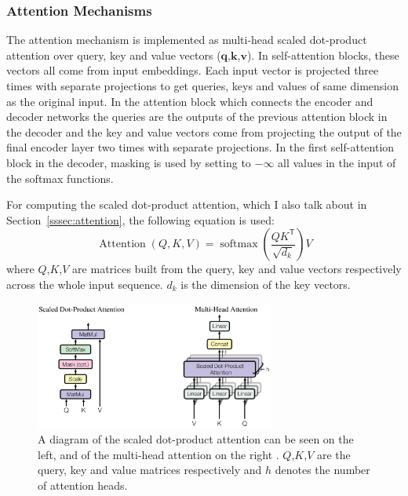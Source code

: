 \documentclass[12pt]{article}
\DeclareMathOperator{\Attention}{Attention}
\DeclareMathOperator{\softmax}{softmax}
\begin{document}
\subsubsection{Attention Mechanisms} \label{sssec:trf_attention}
The attention mechanism is implemented as multi-head scaled dot-product attention over query, key and value vectors (\(\bm{q}\),\(\bm{k}\),\(\bm{v}\)). In self-attention blocks, these vectors all come from input embeddings. Each input vector is projected three times with separate projections to get queries, keys and values of same dimension as the original input. In the attention block which connects the encoder and decoder networks the queries are the outputs of the previous attention block in the decoder and the key and value vectors come from projecting the output of the final encoder layer two times with separate projections. In the first self-attention block in the decoder, masking is used by setting to \(-\infty\) all values in the input of the softmax functions.

For computing the scaled dot-product attention, which I also talk about in Section~\ref{sssec:attention}, the following equation is used:
\begin{equation}
\Attention(Q,K,V)=\softmax\left(\frac{QK^\mathsf{T}}{\sqrt{d_k}}\right)V
\end{equation}
where \(Q\),\(K\),\(V\) are matrices built from the query, key and value vectors respectively across the whole input sequence. \(d_k\) is the dimension of the key vectors.

\begin{figure}[H] 
	\centering
	\includegraphics[width=0.7\textwidth]{pics/trf_attention.png}
	\caption{A diagram of the scaled dot-product attention can be seen on the left, and of the multi-head attention on the right \cite{Vaswani:2017}. \(Q\),\(K\),\(V\) are the query, key and value matrices respectively and \(h\) denotes the number of attention heads.}
	\label{fig:trf_attention}
\end{figure}
\end{document}
